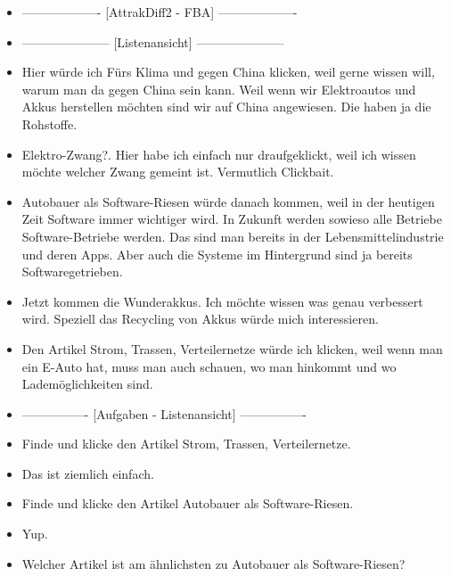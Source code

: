 {\begin{itemize}[]
                  Lustige Frage.
                  Maus bewegen, klicken und lesen.
                  Schwierig ist das jetzt nicht.
            \item {-------------------} [AttrakDiff2 - FBA] {-------------------}
            \item {---------------------} [Listenansicht] {---------------------}
            \item {} Hier würde ich \flqq Fürs Klima und gegen China\frqq{} klicken, weil gerne wissen will, warum man da gegen China sein kann.
                  Weil wenn wir Elektroautos und Akkus herstellen möchten sind wir auf China angewiesen.
                  Die haben ja die Rohstoffe.
            \item {} \flqq Elektro-Zwang?\frqq{}.
                  Hier habe ich einfach nur draufgeklickt, weil ich wissen möchte welcher Zwang gemeint ist.
                  Vermutlich Clickbait.
            \item {} \flqq Autobauer als Software-Riesen\frqq{} würde danach kommen, weil in der heutigen Zeit Software immer wichtiger wird.
                  In Zukunft werden sowieso alle Betriebe Software-Betriebe werden.
                  Das sind man bereits in der Lebensmittelindustrie und deren Apps.
                  Aber auch die Systeme im Hintergrund sind ja bereits Softwaregetrieben.
            \item {} \flqq Jetzt kommen die Wunderakkus\frqq{}.
                  Ich möchte wissen was genau verbessert wird.
                  Speziell das Recycling von Akkus würde mich interessieren.
            \item {} Den Artikel \flqq Strom, Trassen, Verteilernetze\frqq{} würde ich klicken, weil wenn man ein E-Auto hat, muss man auch schauen, wo man hinkommt und wo Lademöglichkeiten sind.
            \item {----------------} [Aufgaben - Listenansicht] {----------------}
            \item {} Finde und klicke den Artikel \flqq Strom, Trassen, Verteilernetze\frqq{}.
            \item {} Das ist ziemlich einfach.
            \item {} Finde und klicke den Artikel \flqq Autobauer als Software-Riesen\frqq{}.
            \item {} Yup.
            \item {} Welcher Artikel ist am ähnlichsten zu \flqq Autobauer als Software-Riesen\frqq{}?

\end{itemize}}
